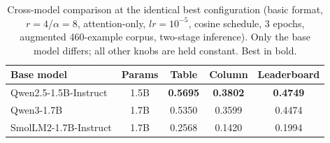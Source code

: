 \begin{table}[t]
\centering
\small
\begin{tabular}{lcccc}
\toprule
Base model & Params & Table & Column & Leaderboard \\
\midrule
Qwen2.5-1.5B-Instruct   & 1.5B & \textbf{0.5695} & \textbf{0.3802} & \textbf{0.4749} \\
Qwen3-1.7B              & 1.7B & 0.5350 & 0.3599 & 0.4474 \\
SmolLM2-1.7B-Instruct   & 1.7B & 0.2568 & 0.1420 & 0.1994 \\
\bottomrule
\end{tabular}
\caption{Cross-model comparison at the identical best configuration (basic format, $r{=}4$/$\alpha{=}8$, attention-only, $lr{=}10^{-5}$, cosine schedule, 3 epochs, augmented 460-example corpus, two-stage inference). Only the base model differs; all other knobs are held constant. Best in bold.}
\label{tab:cross-model}
\end{table}
